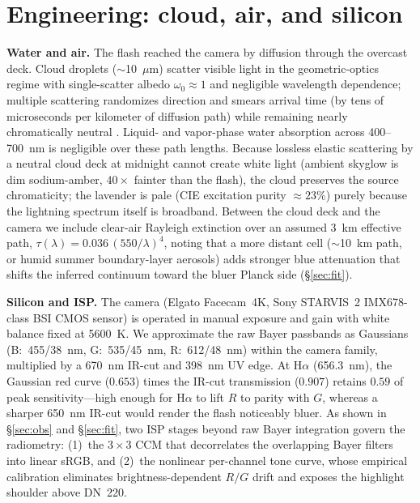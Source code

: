 \documentclass[11pt,a4paper]{article}
\begin{document}
\section{Engineering: cloud, air, and silicon}
\label{sec:engineering}
\textbf{Water and air.} The flash reached the camera by diffusion through the
overcast deck. Cloud droplets ($\sim$10~$\mu$m) scatter visible light in the
geometric-optics regime with single-scatter albedo $\omega_0\approx 1$ and
negligible wavelength dependence; multiple scattering randomizes direction
and smears arrival time (by tens of microseconds per kilometer of diffusion
path) while remaining nearly chromatically neutral
\citep{thomasonkrider1982,koshak1994,bohren1987}. Liquid- and vapor-phase
water absorption across 400--700~nm is negligible over these path lengths.
Because lossless elastic scattering by a neutral cloud deck at midnight cannot
create white light (ambient skyglow is dim sodium-amber, $40\times$ fainter
than the flash), the cloud preserves the source chromaticity; the lavender is
pale (CIE excitation purity $\approx 23\%$) purely because the lightning
spectrum itself is broadband. Between the cloud deck and the camera we include
clear-air Rayleigh extinction over an assumed 3~km effective path,
$\tau(\lambda)=0.036\,(550/\lambda)^4$, noting that a more distant cell
($\sim$10~km path, or humid summer boundary-layer aerosols) adds stronger blue
attenuation that shifts the inferred continuum toward the bluer Planck side
(\S\ref{sec:fit}).

\textbf{Silicon and ISP.} The camera (Elgato Facecam~4K, Sony STARVIS~2
IMX678-class BSI CMOS sensor) is operated in manual exposure and gain with
white balance fixed at 5600~K. We approximate the raw Bayer passbands as
Gaussians (B:~455/38~nm, G:~535/45~nm, R:~612/48~nm) within the
\citet{jiang2013} camera family, multiplied by a 670~nm IR-cut and 398~nm UV
edge. At H$\alpha$ (656.3~nm), the Gaussian red curve ($0.653$) times the
IR-cut transmission ($0.907$) retains $0.59$ of peak sensitivity---high enough
for H$\alpha$ to lift $R$ to parity with $G$, whereas a sharper 650~nm IR-cut
would render the flash noticeably bluer. As shown in \S\ref{sec:obs} and
\S\ref{sec:fit}, two ISP stages beyond raw Bayer integration govern the
radiometry: (1)~the $3\times 3$ CCM that decorrelates the overlapping Bayer
filters into linear sRGB, and (2)~the nonlinear per-channel tone curve, whose
empirical calibration eliminates brightness-dependent $R/G$ drift and exposes
the highlight shoulder above DN~220.
\end{document}
